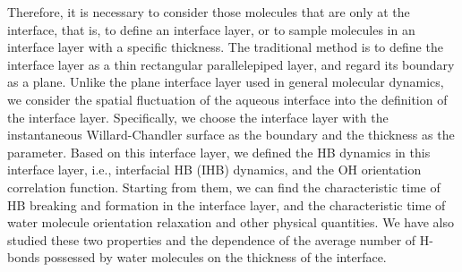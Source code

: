 Therefore, it is necessary to consider those molecules that are only at the interface, 
that is, to define an interface layer, or to sample molecules in an interface layer with a specific thickness. 
The traditional method is to define the interface layer as a thin rectangular parallelepiped layer, and regard its boundary as a plane.
Unlike the plane interface layer used in general molecular dynamics, 
we consider the spatial fluctuation of the aqueous interface into the definition of the interface layer. 
Specifically, we choose the interface layer with the instantaneous Willard-Chandler surface as the boundary and the thickness as the parameter. 
Based on this interface layer, we defined the HB dynamics in this interface layer, 
i.e., interfacial HB (IHB) dynamics, and the OH orientation correlation function. 
Starting from them, we can find the characteristic time of HB breaking and formation in the interface layer, 
and the characteristic time of water molecule orientation relaxation and other physical quantities. 
We have also studied these two properties and the dependence of the average number of H-bonds possessed by water molecules 
on the thickness of the interface. 

